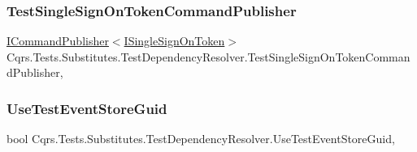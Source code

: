 \subsubsection{\texorpdfstring{Test\+Single\+Sign\+On\+Token\+Command\+Publisher}{TestSingleSignOnTokenCommandPublisher}}
{\footnotesize\ttfamily \hyperlink{interfaceCqrs_1_1Commands_1_1ICommandPublisher}{I\+Command\+Publisher}$<$\hyperlink{interfaceCqrs_1_1Authentication_1_1ISingleSignOnToken}{I\+Single\+Sign\+On\+Token}$>$ Cqrs.\+Tests.\+Substitutes.\+Test\+Dependency\+Resolver.\+Test\+Single\+Sign\+On\+Token\+Command\+Publisher\hspace{0.3cm}{\ttfamily [get]}, {\ttfamily [protected]}}

\mbox{\label{classCqrs_1_1Tests_1_1Substitutes_1_1TestDependencyResolver_a000d2ee924b6f60bc77174495ad9ca89_a000d2ee924b6f60bc77174495ad9ca89}} 
\subsubsection{\texorpdfstring{Use\+Test\+Event\+Store\+Guid}{UseTestEventStoreGuid}}
{\footnotesize\ttfamily bool Cqrs.\+Tests.\+Substitutes.\+Test\+Dependency\+Resolver.\+Use\+Test\+Event\+Store\+Guid\hspace{0.3cm}{\ttfamily [get]}, {\ttfamily [set]}}

